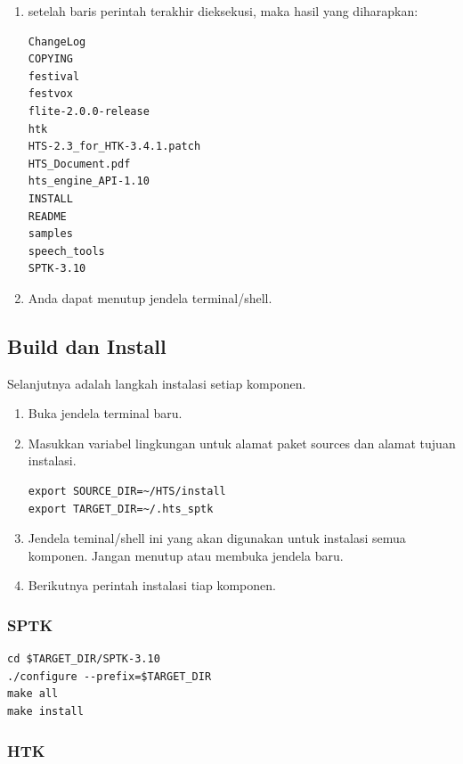 \documentclass[12pt,]{article}
\begin{document}
\begin{enumerate}
		\newpage
		\item setelah baris perintah terakhir dieksekusi, maka hasil yang diharapkan:
		\begin{verbatim}
ChangeLog
COPYING
festival
festvox
flite-2.0.0-release
htk
HTS-2.3_for_HTK-3.4.1.patch
HTS_Document.pdf
hts_engine_API-1.10
INSTALL
README
samples
speech_tools
SPTK-3.10
		\end{verbatim}

		\item Anda dapat menutup jendela terminal/shell.

	\end{enumerate}

	\subsection{Build dan Install}

	Selanjutnya adalah langkah instalasi setiap komponen.

	\begin{enumerate}
		\item Buka jendela terminal baru.

		\item Masukkan variabel lingkungan untuk alamat paket sources dan alamat tujuan instalasi.
		\begin{verbatim}
export SOURCE_DIR=~/HTS/install
export TARGET_DIR=~/.hts_sptk
		\end{verbatim}

		\item Jendela teminal/shell ini yang akan digunakan untuk instalasi semua komponen.
		Jangan menutup atau membuka jendela baru.

		\item Berikutnya perintah instalasi tiap komponen.
	\end{enumerate}

	\subsubsection{SPTK}
	\begin{verbatim}
cd $TARGET_DIR/SPTK-3.10
./configure --prefix=$TARGET_DIR
make all
make install
	\end{verbatim}

	\subsubsection{HTK}
\end{document}
